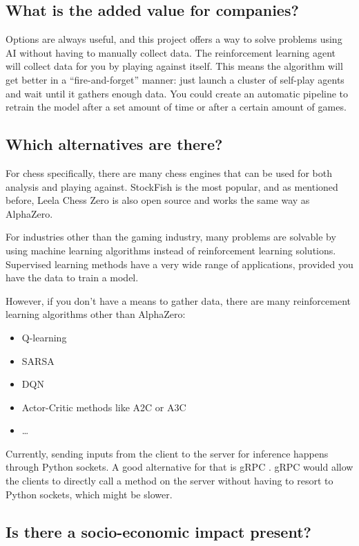 \documentclass{article}
\begin{document}
\subsection{What is the added value for companies?}

Options are always useful, and this project offers a way to solve problems 
using AI without having to manually collect data. The reinforcement learning agent 
will collect data for you by playing against itself. This means the algorithm will
get better in a ``fire-and-forget'' manner: just launch a cluster of self-play agents
and wait until it gathers enough data. You could create an automatic pipeline to
retrain the model after a set amount of time or after a certain amount of games.

\subsection{Which alternatives are there?}

For chess specifically, there are many chess engines that can be used for both analysis
and playing against. StockFish is the most popular, and as mentioned before, 
Leela Chess Zero is also open source and works the same way as AlphaZero. 

For industries other than the gaming industry, many problems are solvable by using
machine learning algorithms instead of reinforcement learning solutions. 
Supervised learning methods have a very wide range of applications, provided 
you have the data to train a model.

However, if you don't have a means to gather data, there are many reinforcement
learning algorithms other than AlphaZero:

\begin{itemize}
    \item Q-learning
    \item SARSA
    \item DQN
    \item Actor-Critic methods like A2C or A3C
    \item \dots
\end{itemize}

Currently, sending inputs from the client to the server for inference
happens through Python sockets. A good alternative for that is gRPC \cite{IntroductionGRPC}. 
gRPC would allow the clients to directly call a method on the server without having to 
resort to Python sockets, which might be slower. 

\subsection{Is there a socio-economic impact present?}
\end{document}

